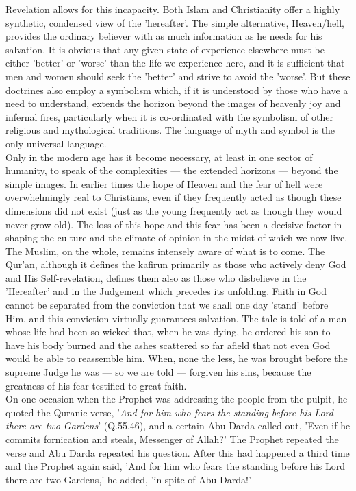 \documentclass[10pt, twoside]{book}
\begin{document}
Revelation allows for this incapacity. Both Islam and Christianity offer a highly synthetic, 
condensed view of the 'hereafter'. The simple alternative, Heaven/hell, provides the ordinary 
believer with as much information as he needs for his salvation. It is obvious that any given state 
of experience elsewhere must be either 'better' or 'worse' than the life we experience here, and it 
is sufficient that men and women should seek the 'better' and strive to avoid the 'worse'. But these 
doctrines also employ a symbolism which, if it is understood by those who have a need to understand, 
extends the horizon beyond the images of heavenly joy and infernal fires, particularly when it is 
co-ordinated with the symbolism of other religious and mythological traditions. The language of myth 
and symbol is the only universal language. \\

Only in the modern age has it become necessary, at least in one sector of humanity, to speak of the 
complexities --- the extended horizons --- beyond the simple images. In earlier times the hope of Heaven 
and the fear of hell were overwhelmingly real to Christians, even if they frequently acted as though 
these dimensions did not exist (just as the young frequently act as though they would never grow 
old). The loss of this hope and this fear has been a decisive factor in shaping the culture and the 
climate of opinion in the midst of which we now live. \\

The Muslim, on the whole, remains intensely aware of what is to come. The Qur'an, although it defines 
the kafirun primarily as those who actively deny God and His Self\hyp{}revelation, defines them also as 
those who disbelieve in the 'Hereafter' and in the Judgement which precedes its unfolding. Faith in 
God cannot be separated from the conviction that we shall one day 'stand' before Him, and this 
conviction virtually guarantees salvation. The tale is told of a man whose life had been so wicked 
that, when he was dying, he ordered his son to have his body burned and the ashes scattered so far 
afield that not even God would be able to reassemble him. When, none the less, he was brought before 
the supreme Judge he was --- so we are told --- forgiven his sins, because the greatness of his fear 
testified to great faith.\\ 

On one occasion when the Prophet was addressing the people from the pulpit, he quoted the Quranic 
verse, '\emph{And for him who fears the standing before his Lord there are two Gardens}' (Q.55.46), and a 
certain Abu Darda called out, 'Even if he commits fornication and steals, Messenger of Allah?' The 
Prophet repeated the verse and Abu Darda repeated his question. After this had happened a third time 
and the Prophet again said, 'And for him who fears the standing before his Lord there are two 
Gardens,' he added, 'in spite of Abu Darda!' \\
\end{document}
